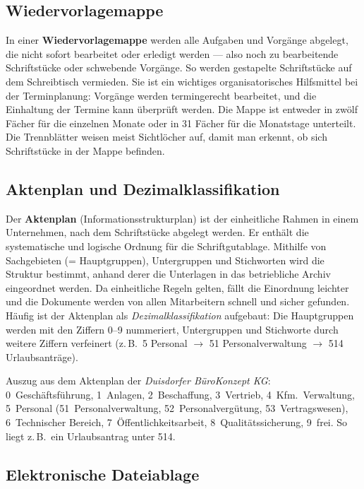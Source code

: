 \documentclass[11pt, a4paper]{article}
\begin{document}
\subsection{Wiedervorlagemappe}

In einer \textbf{Wiedervorlagemappe} werden alle Aufgaben und Vorgänge abgelegt, die
nicht sofort bearbeitet oder erledigt werden --- also noch zu bearbeitende Schriftstücke
oder schwebende Vorgänge. So werden gestapelte Schriftstücke auf dem Schreibtisch
vermieden. Sie ist ein wichtiges organisatorisches Hilfsmittel bei der Terminplanung:
Vorgänge werden termingerecht bearbeitet, und die Einhaltung der Termine kann überprüft
werden. Die Mappe ist entweder in zwölf Fächer für die einzelnen Monate oder in 31 Fächer
für die Monatstage unterteilt. Die Trennblätter weisen meist Sichtlöcher auf, damit man
erkennt, ob sich Schriftstücke in der Mappe befinden.

\subsection{Aktenplan und Dezimalklassifikation}

Der \textbf{Aktenplan} (Informationsstrukturplan) ist der einheitliche Rahmen in einem
Unternehmen, nach dem Schriftstücke abgelegt werden. Er enthält die systematische und
logische Ordnung für die Schriftgutablage. Mithilfe von Sachgebieten (= Hauptgruppen),
Untergruppen und Stichworten wird die Struktur bestimmt, anhand derer die Unterlagen in
das betriebliche Archiv eingeordnet werden. Da einheitliche Regeln gelten, fällt die
Einordnung leichter und die Dokumente werden von allen Mitarbeitern schnell und sicher
gefunden. Häufig ist der Aktenplan als \emph{Dezimalklassifikation} aufgebaut: Die
Hauptgruppen werden mit den Ziffern 0--9 nummeriert, Untergruppen und Stichworte durch
weitere Ziffern verfeinert (z.\,B.\ 5 Personal $\rightarrow$ 51 Personalverwaltung
$\rightarrow$ 514 Urlaubsanträge).

\begin{beispiel}
Auszug aus dem Aktenplan der \emph{Duisdorfer BüroKonzept KG}: 0~Geschäftsführung,
1~Anlagen, 2~Beschaffung, 3~Vertrieb, 4~Kfm.\ Verwaltung, 5~Personal (51~Personal\-verwaltung,
52~Personalvergütung, 53~Vertragswesen), 6~Technischer Bereich, 7~Öffentlichkeitsarbeit,
8~Qualitätssicherung, 9~frei. So liegt z.\,B.\ ein Urlaubsantrag unter 514.
\end{beispiel}

\subsection{Elektronische Dateiablage}
\end{document}
